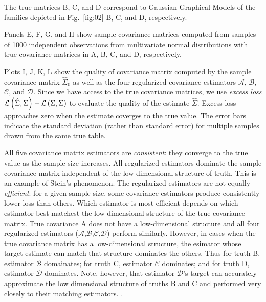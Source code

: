 The true matrices B, C, and D correspond to Gaussian Graphical Models of the families depicted in Fig.~\ref{fig:02} B, C, and D, respectively. 

Panels E, F, G, and H show sample covariance matrices computed from samples of 1000 independent observations from multivariate normal distributions with true covariance matrices in A, B, C, and D, respectively.  

Plots I, J, K, L show the quality of covariance matrix computed by the sample covariance matrix $\hat\Sigma_0$ as well as the four regularized covariance estimators $\mathcal A$, $\mathcal B$, $\mathcal C$, and $\mathcal D$.  Since we have access to the true covariance matrices, we use \emph{excess loss} $\mathcal L\left(\hat\Sigma,\Sigma\right)-\mathcal L\left(\Sigma,\Sigma\right)$ to evaluate the quality of the estimate $\hat\Sigma$. Excess loss approaches zero when the estimate coverges to the true value.  The error bars indicate the standard deviation (rather than standard error) for multiple samples drawn from the same true table.

All five covariance matrix estimators are \emph{consistent}: they converge to the true value as the sample size increases.   All regularized estimators dominate the sample covariance matrix independent of the low-dimensional structure of truth.  This is an example of Stein's phenomenon.  The regularized estimators are not equally \emph{efficient}: for a given sample size, some covariance estimators produce consistently lower loss than others.  Which estimator is most efficient depends on which estimator best matchest the low-dimensional structure of the true covariance matrix.  True covariance A does not have a low-dimensional structure and all four regularized estimators ($\mathcal A$,$\mathcal B$,$\mathcal C$,$\mathcal D$) perform similarly.  However, in cases when the true covariance matrix has a low-dimensional structure, the esimator whose target estimate can match that structure dominates the others.  Thus for truth B, estimator $\mathcal B$ domainates; for truth C, estimator $\mathcal C$ dominates; and for truth D,  estimator $\mathcal D$ dominates.  Note, however, that estimator $\mathcal D$'s target can accurately approximate the low dimensional structure of truths B and C and performed very closely to their matching estimators. .

